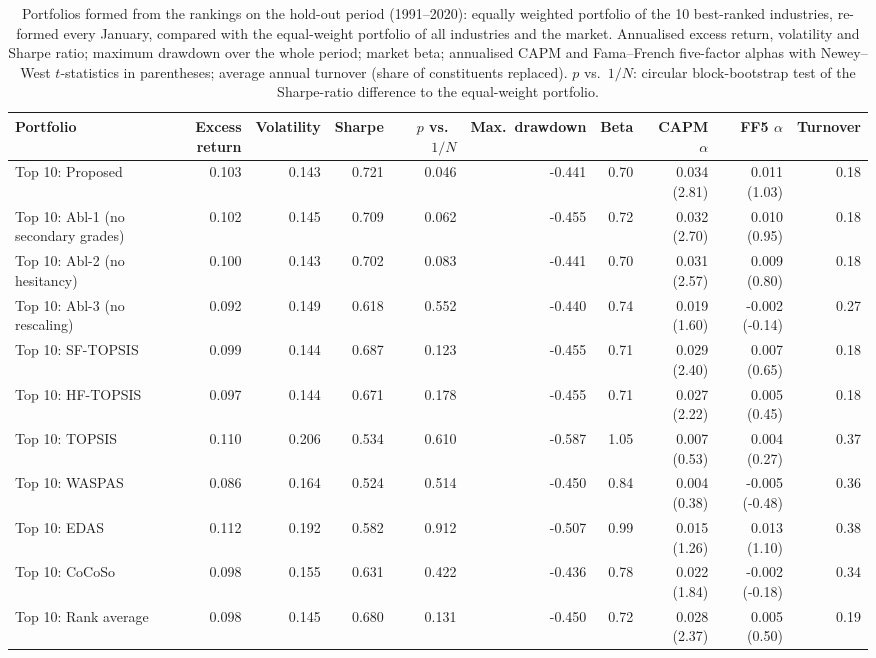 \begin{table}[!htbp]
\centering
\scriptsize
\caption{Portfolios formed from the rankings on the hold-out period (1991--2020): equally weighted portfolio of the 10 best-ranked industries, re-formed every January, compared with the equal-weight portfolio of all industries and the market. Annualised excess return, volatility and Sharpe ratio; maximum drawdown over the whole period; market beta; annualised CAPM and Fama--French five-factor alphas with Newey--West $t$-statistics in parentheses; average annual turnover (share of constituents replaced). $p$ vs.\ $1/N$: circular block-bootstrap test of the Sharpe-ratio difference to the equal-weight portfolio.}\label{tab:portfolio}
\begin{adjustbox}{max width=\textwidth}
\begin{tabular}{lrrrrrrrrr}
\toprule
Portfolio & Excess return & Volatility & Sharpe & $p$ vs.\ $1/N$ & Max.\ drawdown & Beta & CAPM $\alpha$ & FF5 $\alpha$ & Turnover \\
\midrule
Top 10: Proposed & 0.103 & 0.143 & 0.721 & 0.046 & -0.441 & 0.70 & 0.034 (2.81) & 0.011 (1.03) & 0.18 \\
Top 10: Abl-1 (no secondary grades) & 0.102 & 0.145 & 0.709 & 0.062 & -0.455 & 0.72 & 0.032 (2.70) & 0.010 (0.95) & 0.18 \\
Top 10: Abl-2 (no hesitancy) & 0.100 & 0.143 & 0.702 & 0.083 & -0.441 & 0.70 & 0.031 (2.57) & 0.009 (0.80) & 0.18 \\
Top 10: Abl-3 (no rescaling) & 0.092 & 0.149 & 0.618 & 0.552 & -0.440 & 0.74 & 0.019 (1.60) & -0.002 (-0.14) & 0.27 \\
Top 10: SF-TOPSIS & 0.099 & 0.144 & 0.687 & 0.123 & -0.455 & 0.71 & 0.029 (2.40) & 0.007 (0.65) & 0.18 \\
Top 10: HF-TOPSIS & 0.097 & 0.144 & 0.671 & 0.178 & -0.455 & 0.71 & 0.027 (2.22) & 0.005 (0.45) & 0.18 \\
Top 10: TOPSIS & 0.110 & 0.206 & 0.534 & 0.610 & -0.587 & 1.05 & 0.007 (0.53) & 0.004 (0.27) & 0.37 \\
Top 10: WASPAS & 0.086 & 0.164 & 0.524 & 0.514 & -0.450 & 0.84 & 0.004 (0.38) & -0.005 (-0.48) & 0.36 \\
Top 10: EDAS & 0.112 & 0.192 & 0.582 & 0.912 & -0.507 & 0.99 & 0.015 (1.26) & 0.013 (1.10) & 0.38 \\
Top 10: CoCoSo & 0.098 & 0.155 & 0.631 & 0.422 & -0.436 & 0.78 & 0.022 (1.84) & -0.002 (-0.18) & 0.34 \\
Top 10: Rank average & 0.098 & 0.145 & 0.680 & 0.131 & -0.450 & 0.72 & 0.028 (2.37) & 0.005 (0.50) & 0.19 \\

\end{tabular}
\end{adjustbox}
\end{table}
